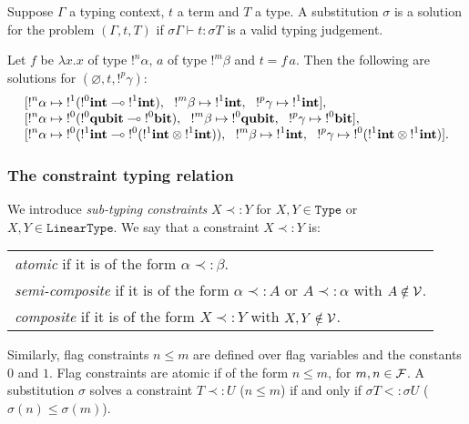 \begin{defn}
	\label{decl_problem}
	Suppose $\Gamma$ a typing context, $t$ a term and $T$ a type. A substitution $\sigma$ is a solution for the problem $(\Gamma, t, T)$ if
	$\sigma \Gamma \vdash t : \sigma T$ is a valid typing judgement.
\end{defn}

\begin{exmp} Let $f$ be $\lambda x.x$ of type $!^n \alpha$, $a$ of type $!^m \beta$ and $t = f \, a$. Then the following 	are solutions for $(\varnothing, t, !^p \gamma)$:
  \[
  \begin{array}{l}\relax
    [{!}^n\alpha \mapsto {!}^1({!}^0\textrm{\bf int} \multimap {!}^1\textrm{\bf int}),~~ {!}^m\beta \mapsto {!}^1\textrm{\bf int},~~ {!}^p\gamma \mapsto {!}^1\textrm{\bf int}], \\\relax
    [{!}^n\alpha \mapsto {!}^0({!}^0\textrm{\bf qubit} \multimap {!}^0\textrm{\bf bit}),~~ {!}^m\beta \mapsto {!}^0\textrm{\bf qubit},~~ {!}^p\gamma \mapsto {!}^0\textrm{\bf bit}], \\\relax
    [{!}^n\alpha \mapsto {!}^0({!}^1\textrm{\bf int} \multimap {!}^0({!}^1\textrm{\bf int} \otimes {!}^1\textrm{\bf int})),
    ~~ {!}^m\beta \mapsto {!}^1\textrm{\bf int},
    ~~ {!}^p\gamma \mapsto {!}^0({!}^1\textrm{\bf int} \otimes {!}^1\textrm{\bf int})].
  \end{array}
  \]
\end{exmp}

\subsubsection{The constraint typing relation}

\begin{defn} We introduce {\em sub-typing constraints} $X \prec: Y$ for $X, Y \in \texttt{Type}$ or $X, Y \in \texttt{LinearType}$.
We say that a constraint $X \prec: Y$ is:
		\begin{center}
		\begin{tabular}{l}
			\textit{atomic} if it is of the form $\alpha \prec: \beta$. \\
			\textit{semi-composite} if it is of the form $\alpha \prec: A$ or $A \prec: \alpha$ with $A \notin \mathcal{V}$. \\
			\textit{composite} if it is of the form $X \prec: Y$ with $X, Y \notin \mathcal{V}$.
		\end{tabular}
		\end{center}
  Similarly, flag constraints $n \le m$ are defined over flag variables and the constants $0$ and $1$. Flag constraints are atomic if of the form $n \le m$,
  for $m, n\in \mathcal{F}$.
  A substitution $\sigma$ solves a constraint $T \prec: U$ ($n \le m$) if and only if $\sigma T <: \sigma U$ ($\sigma(n) \le \sigma(m)$).
\end{defn}

